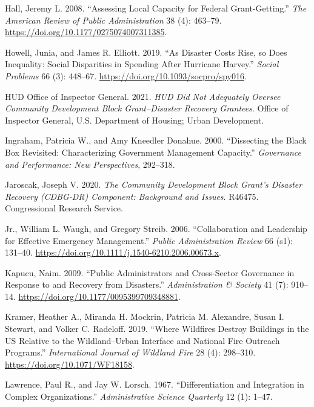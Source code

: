 \documentclass[
  12pt,
  letterpaper,
]{article}
\newlength{\cslhangindent}
\newenvironment{CSLReferences}[2] %
 {\begin{list}{}{%
  \setlength{\itemindent}{0pt}
  \setlength{\leftmargin}{0pt}
  \setlength{\parsep}{0pt}
  \ifodd #1
   \setlength{\leftmargin}{\cslhangindent}
   \setlength{\itemindent}{-1\cslhangindent}
  \fi
  \setlength{\itemsep}{#2\baselineskip}}}
 {\end{list}}
\begin{document}
\begin{CSLReferences}{1}{1}
Hall, Jeremy L. 2008. {``Assessing Local Capacity for Federal
Grant-Getting.''} \emph{The American Review of Public Administration} 38
(4): 463--79. \url{https://doi.org/10.1177/0275074007311385}.

Howell, Junia, and James R. Elliott. 2019. {``As Disaster Costs Rise, so
Does Inequality: Social Disparities in Spending After {H}urricane
{H}arvey.''} \emph{Social Problems} 66 (3): 448--67.
\url{https://doi.org/10.1093/socpro/spy016}.

HUD Office of Inspector General. 2021. \emph{{HUD} Did Not Adequately
Oversee {C}ommunity {D}evelopment {B}lock {G}rant--{D}isaster {R}ecovery
Grantees}. Office of Inspector General, U.S. Department of Housing;
Urban Development.

Ingraham, Patricia W., and Amy Kneedler Donahue. 2000. {``Dissecting the
Black Box Revisited: Characterizing Government Management Capacity.''}
\emph{Governance and Performance: New Perspectives}, 292--318.

Jaroscak, Joseph V. 2020. \emph{The Community Development Block Grant's
Disaster Recovery ({CDBG-DR}) Component: Background and Issues}. R46475.
Congressional Research Service.

Jr., William L. Waugh, and Gregory Streib. 2006. {``Collaboration and
Leadership for Effective Emergency Management.''} \emph{Public
Administration Review} 66 (s1): 131--40.
\url{https://doi.org/10.1111/j.1540-6210.2006.00673.x}.

Kapucu, Naim. 2009. {``Public Administrators and Cross-Sector Governance
in Response to and Recovery from Disasters.''} \emph{Administration \&
Society} 41 (7): 910--14.
\url{https://doi.org/10.1177/0095399709348881}.

Kramer, Heather A., Miranda H. Mockrin, Patricia M. Alexandre, Susan I.
Stewart, and Volker C. Radeloff. 2019. {``Where Wildfires Destroy
Buildings in the {US} Relative to the Wildland--Urban Interface and
National Fire Outreach Programs.''} \emph{International Journal of
Wildland Fire} 28 (4): 298--310. \url{https://doi.org/10.1071/WF18158}.

Lawrence, Paul R., and Jay W. Lorsch. 1967. {``Differentiation and
Integration in Complex Organizations.''} \emph{Administrative Science
Quarterly} 12 (1): 1--47.


\end{CSLReferences}
\end{document}
